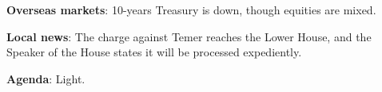\documentclass[11pt]{article}
\date{}
\title{}
\begin{document}
\begin{compactitem}
\item \textbf{Overseas markets}: 10-years Treasury is down, though equities are
mixed.
\item \textbf{Local news}: The charge against Temer reaches the Lower House, and
the Speaker of the House states it will be processed expediently.
\item \textbf{Agenda}: Light.
\end{compactitem}
\end{document}
